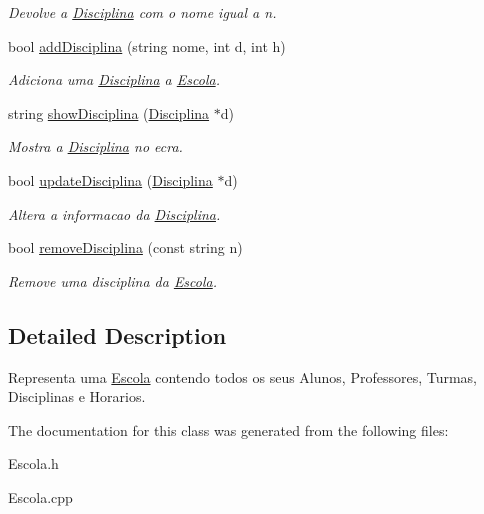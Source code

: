 \begin{DoxyCompactItemize}
\begin{DoxyCompactList}\small\item\em Devolve a \hyperlink{class_disciplina}{Disciplina} com o nome igual a n. \end{DoxyCompactList}\item 
\hypertarget{class_escola_ad60836279a3f0a7d974a49b950aabda0}{bool \hyperlink{class_escola_ad60836279a3f0a7d974a49b950aabda0}{add\-Disciplina} (string nome, int d, int h)}\label{class_escola_ad60836279a3f0a7d974a49b950aabda0}

\begin{DoxyCompactList}\small\item\em Adiciona uma \hyperlink{class_disciplina}{Disciplina} a \hyperlink{class_escola}{Escola}. \end{DoxyCompactList}\item 
\hypertarget{class_escola_a3578c85887dd28c9d0b6f7c7f10f3020}{string \hyperlink{class_escola_a3578c85887dd28c9d0b6f7c7f10f3020}{show\-Disciplina} (\hyperlink{class_disciplina}{Disciplina} $\ast$d)}\label{class_escola_a3578c85887dd28c9d0b6f7c7f10f3020}

\begin{DoxyCompactList}\small\item\em Mostra a \hyperlink{class_disciplina}{Disciplina} no ecra. \end{DoxyCompactList}\item 
\hypertarget{class_escola_a3e5bd122514b59138e8fac07ca63e23a}{bool \hyperlink{class_escola_a3e5bd122514b59138e8fac07ca63e23a}{update\-Disciplina} (\hyperlink{class_disciplina}{Disciplina} $\ast$d)}\label{class_escola_a3e5bd122514b59138e8fac07ca63e23a}

\begin{DoxyCompactList}\small\item\em Altera a informacao da \hyperlink{class_disciplina}{Disciplina}. \end{DoxyCompactList}\item 
\hypertarget{class_escola_a2e726efed10bae8f782f2f5370ec9f44}{bool \hyperlink{class_escola_a2e726efed10bae8f782f2f5370ec9f44}{remove\-Disciplina} (const string n)}\label{class_escola_a2e726efed10bae8f782f2f5370ec9f44}

\begin{DoxyCompactList}\small\item\em Remove uma disciplina da \hyperlink{class_escola}{Escola}. \end{DoxyCompactList}\end{DoxyCompactItemize}


\subsection{Detailed Description}
Representa uma \hyperlink{class_escola}{Escola} contendo todos os seus Alunos, Professores, Turmas, Disciplinas e Horarios. 

The documentation for this class was generated from the following files\-:\begin{DoxyCompactItemize}
\item 
Escola.\-h\item 
Escola.\-cpp\end{DoxyCompactItemize}
